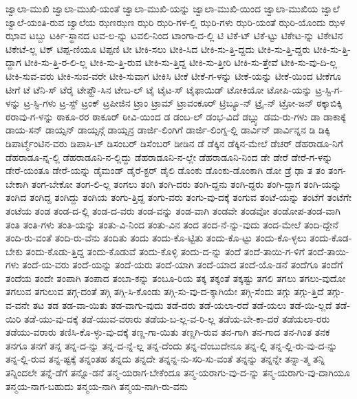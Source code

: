 {ಜ್ವಾಲಾ-ಮುಖಿ
ಜ್ವಾಲಾ-ಮುಖಿ-ಯಂತೆ
ಜ್ವಾಲಾ-ಮುಖಿ-ಯನ್ನು
ಜ್ವಾಲಾ-ಮುಖಿ-ಯಿಂದ
ಜ್ವಾಲಾ-ಮುಖಿಯ
ಜ್ವಾಲೆ
ಜ್ವಾಲೆ-ಯಂತಿ-ರುವ
ಜ್ವಾಲೆಯ
ಝಣಝಣ
ಝರಿ
ಝರಿ-ಗಳ-ಲ್ಲಿ
ಝರಿ-ಗಳು
ಝರಿ-ಯಂತೆ
ಝರಿ-ಯೊಂದು
ಝಳ
ಝಾವ
ಟಬ್ಬು
ಟರ್ಕಿ-ಸ್ಥಾನದ
ಟವ-ಲ-ನ್ನು
ಟವಲಿ-ನಿಂದ
ಟಾಂಗಾ-ದ-ಲ್ಲಿ
ಟಿ
ಟಿಕೆ-ಟ್
ಟಿಕೆ-ಟ್ಟು
ಟಿಕೇಟ-ನ್ನು
ಟಿಕೇಟಿನ
ಟಿಕೇಟೆ-ಲ್ಲ
ಟಿಕ್
ಟಿಪ್ಪ-ಣಿಯೂ
ಟಿಪ್ಪಣಿ
ಟೀ
ಟೀಕಿ-ಸಲು
ಟೀಕಿ-ಸಿದ
ಟೀಕಿ-ಸು-ತ್ತಿ-ದ್ದದು
ಟೀಕಿ-ಸು-ತ್ತಿ-ದ್ದರು
ಟೀಕಿ-ಸು-ತ್ತಿ-ದ್ದಾಗ
ಟೀಕಿ-ಸು-ತ್ತಿ-ರ-ಲಿ-ಲ್ಲ
ಟೀಕಿ-ಸು-ತ್ತಿ-ರುವ
ಟೀಕಿ-ಸು-ತ್ತಿದ್ದ
ಟೀಕಿ-ಸು-ತ್ತೀರಿ
ಟೀಕಿ-ಸು-ತ್ತೇವೆ
ಟೀಕಿ-ಸು-ವು-ದಿ-ಲ್ಲ
ಟೀಕಿ-ಸುವ-ವರು
ಟೀಕಿ-ಸುವ-ವರೇ
ಟೀಕಿ-ಸುವಾಗ
ಟೀಕಿಸಿ
ಟೀಕೆ
ಟೀಕೆ-ಗ-ಳನ್ನು
ಟೀಕೆ-ಯನ್ನು
ಟೀಕೆ-ಯಿಂದ
ಟೀಕೆಗೂ
ಟೀಗೆ
ಟೆ
ಟೆನಿ-ಸ್
ಟೆರೈ
ಟೇಪ್ಹೌ-ಸಿನ
ಟೇಬ-ಲ್
ಟೈ
ಟೈಟ-ಸ್
ಟೈಫಾಯಿಡ್
ಟೋಕಿಯೋ
ಟೋಪಿ-ಯನ್ನು
ಟ್ರ-ಸ್ಟಿ-ಗ-ಳನ್ನು
ಟ್ರ-ಸ್ಟಿ-ಗಳು
ಟ್ರ-ಸ್ಟ್
ಟ್ರಂಕ್
ಟ್ರಪೀಜಿನ
ಟ್ರಾಂ
ಟ್ರಾಮ್
ಟ್ರಾವಂಕೂರ್
ಟ್ರಿಬ್ಯೂ-ನ್
ಟ್ರೈ-ನ್
ಟ್ರೋ-ಜನ್
ಠಕ್ಕಾಬಿಕ್ಕಿ
ಠರಾವು-ಗ-ಳನ್ನು
ಠಾಕೂ-ರರ
ಠಾಕೂರ್
ಠೀವಿ-ಯಿಂದ
ಡ
ಡಂಬ-ಲ್
ಡಂಭ-ವಿದೆ
ಡಬ್ಲ್ಯು
ಡಮ-ರು-ಗಳು
ಡಾ
ಡಾಕಾಕ್ಕೆ
ಡಾಯ-ಸನ್
ಡಾಯ್ಸನ್
ಡಾಯ್ಸನ್ಗೆ
ಡಾಯ್ಸನ್ರ
ಡಾರ್ಜಿ-ಲಿಂಗಿಗೆ
ಡಾರ್ಜಿ-ಲಿಂಗ್ನ-ಲ್ಲಿ
ಡಾರ್ವಿನ್
ಡಾರ್ವಿನ್ನನ
ಡಿ
ಡಿಕ್ಕಿ
ಡಿಪಾರ್ಟ್ಮೆಂಟಿನ-ವರು
ಡಿಪಾಸಿ-ಟ್
ಡಿಸಂಬರ್
ಡಿಸೆಂಬರ್
ಡೀಡಿನ
ಡೆ
ಡೆಕ್ಕಿನ
ಡೆಕ್ಕಿನ-ಮೇಲೆ
ಡೆಚರ್
ಡೆಹರಾಡೂ-ನಿಗೆ
ಡೆಹರಾಡೂ-ನ್ನ-ಲ್ಲಿ
ಡೆಹರಾಡೂನಿ-ನ-ಲ್ಲಿದ್ದು
ಡೆಹರಾಡೂನಿ-ನ-ಲ್ಲೇ
ಡೆಹರಾಡೂನಿ-ನಿಂದ
ಡೇ
ಡೇರೆ
ಡೇರೆ-ಗ-ಳನ್ನು
ಡೇರೆ-ಯಂತೂ
ಡೇರೆ-ಯನ್ನು
ಡೈಮಂಡ್
ಡೈರೆ-ಕ್ಟರ್
ಡೈಲಿ
ಡೊಂಕು
ಡೊಂಕು-ಡೊಂಕಾಗಿ
ಡೋ
ಡ್ರೆ
ಢಾ
ತ
ತಂ
ತಂಗ-ಬೇಕಾಗಿ
ತಂಗ-ಬೇಕೋ
ತಂಗ-ಲಿ-ಲ್ಲ
ತಂಗಲು
ತಂಗಿ
ತಂಗಿ-ದರು
ತಂಗಿ-ದ್ದನು
ತಂಗಿ-ದ್ದರು
ತಂಗಿ-ದ್ದಾಗ
ತಂಗಿ-ಯನ್ನು
ತಂಗಿದ
ತಂಗಿದ್ದ
ತಂಗಿದ್ದು
ತಂಗಿಯ
ತಂಗು-ತ್ತಿದ್ದ
ತಂಗು-ವರು
ತಂಗು-ವು-ದಕ್ಕೆ
ತಂಗುವ
ತಂಟೆ-ಯನ್ನು
ತಂಟೆಗೆ
ತಂಟೆಗೇ
ತಂಟೆಯ
ತಂಡ
ತಂಡ-ದ-ಲ್ಲಿ
ತಂಡ-ದ-ವರು
ತಂಡ-ವನ್ನು
ತಂಡ-ವಾಗಿ
ತಂಡವೇ
ತಂಡವೋ
ತಂಡೋಪ-ತಂಡ-ವಾಗಿ
ತಂತಿ
ತಂತಿ-ಗಳು
ತಂತಿ-ಯನ್ನು
ತಂತು-ವಿ-ನಿಂದ
ತಂತು-ವಿನ
ತಂದ
ತಂದ-ನೆ-ನ್ನು-ವುದು
ತಂದ-ಮೇಲೆ
ತಂದಿ-ದ್ದೇನೆ
ತಂದಿ-ರು-ವಂತೆ
ತಂದಿ-ರು-ವೆನು
ತಂದಿತು
ತಂದು
ತಂದು-ಕೊ-ಟ್ಟಿತು
ತಂದು-ಕೊ-ಟ್ಟು
ತಂದು-ಕೊ-ಳ್ಳಲು
ತಂದು-ಕೊಡ-ಬೇಕು
ತಂದು-ಕೊಡು-ತ್ತಿದ್ದ
ತಂದು-ಕೊಡುವೆ
ತಂದು-ಕೊಳ್ಳಿ
ತಂದು-ದ-ನ್ನು
ತಂದೆ
ತಂದೆ-ತಾಯಿ-ಗ-ಳಿಗೆ
ತಂದೆ-ತಾಯಿ-ಗಳು
ತಂದೆ-ಯ-ವರು
ತಂದೆ-ಯನ್ನು
ತಂದೆ-ಯರು
ತಂದೆ-ಯಾಗಿ
ತಂದೆ-ಯಾದ
ತಂದೆ-ಯೊ-ಡನೆ
ತಂದೆಗೂ
ತಂದೆಗೆ
ತಂದೆಯ
ತಂದೇ
ತಂಪಾಗಿ
ತಂಪಾದ
ತಂಬಾ-ಕನ್ನು
ತಂಬೂ-ರಿಯ
ತಕ್ಕ
ತಕ್ಕಂತೆ
ತಕ್ಕಷ್ಟು
ತಗಲಿ
ತಗಲು
ತಗಲು-ವುದೋ
ತಗಲುವ
ತಗುಲುವ
ತಗ್ಗ-ದಂತೆ
ತಗ್ಗಿ
ತಗ್ಗಿ-ಸಿ-ಕೊಂಡು
ತಗ್ಗಿ-ಸು-ವು-ದ-ಕ್ಕಾಗಿಯೇ
ತಗ್ಗಿ-ಸೆಂದು
ತಗ್ಗು
ತಗ್ಗು-ತ್ತಿದೆ
ತಗ್ಗು-ವ-ವನೇ
ತಟ
ತಡ
ತಡ-ವಾ-ಯಿತು
ತಡ-ವಾಗು-ವುದು
ತಡೆ-ದರು
ತಡೆ-ಯಲಾ-ರದೆ
ತಡೆ-ಯಲು
ತಡೆ-ಯಿ-ಲ್ಲದೆ
ತಡೆ-ಯಿರಿ
ತಡೆ-ಯು-ವು-ದಕ್ಕೆ
ತಡೆ-ಯುವ-ವರಾರು
ತಡೆಯ-ಬ-ಲ್ಲ-ವ-ರಿ-ಲ್ಲ
ತಡೆಯ-ಬೇ-ಕಾ-ದರೆ
ತಡೆಯಲಾ-ರರು
ತಡೆಯು-ವರಾರು
ತಣಿಸಿ-ಕೊ-ಳ್ಳು-ವು-ದಕ್ಕೆ
ತಣ್ಣ-ಗಾ-ಯಿತು
ತಣ್ಣಗಿ-ರುವ
ತನ-ಗಾಗಿ
ತನ-ಗಾದ
ತನ-ಗಿಂತ
ತನಕ
ತನಗೂ
ತನಗೆ
ತನ್ನ
ತನ್ನ-ದ-ನ್ನು
ತನ್ನ-ದ-ನ್ನೆ-ಲ್ಲ
ತನ್ನ-ದೆಂದು
ತನ್ನ-ದೆಂಬುದೇನೂ
ತನ್ನ-ಲ್ಲಿ
ತನ್ನ-ಲ್ಲಿ-ರು-ವು-ದ-ನ್ನು
ತನ್ನ-ಲ್ಲಿ-ರುವ
ತನ್ನ-ಷ್ಟಕ್ಕೆ
ತನ್ನಂತಹ
ತನ್ನದು
ತನ್ನದೇ
ತನ್ನನ್ನ-ನು-ಸರಿ-ಸು-ವಂತೆ
ತನ್ನನ್ನು
ತನ್ನನ್ನೇ
ತನ್ನಾ-ತ್ಮ
ತನ್ನಿ
ತನ್ನಿಂದಲೇ
ತನ್ನೆ-ಡೆಗೆ
ತನ್ನೊ-ಡನೆ
ತನ್ಮ-ಯರಾಗ-ಬೇಕೆಂದೂ
ತನ್ಮ-ಯರಾಗು-ವು-ದ-ನ್ನು
ತನ್ಮ-ಯರಾಗು-ವು-ದಾಗಿಯೂ
ತನ್ಮಯ-ನಾಗ-ಬಹುದು
ತನ್ಮಯ-ನಾಗಿ
ತನ್ಮಯ-ನಾಗಿ-ರು-ವನು
}
